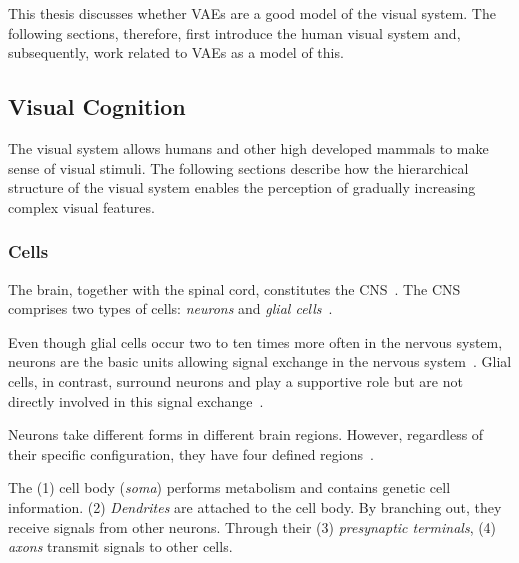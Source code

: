 This thesis discusses whether \acp{VAE} are a good model of the visual system.
The following sections, therefore, first introduce the human visual system and, subsequently, work related to \acp{VAE} as a model of this.

\subsection{Visual Cognition}\label{subsec:human-brain-structure}

The visual system allows humans and other high developed mammals to make sense of visual stimuli.
The following sections describe how the hierarchical structure of the visual system enables the perception of gradually increasing complex visual features.

\subsubsection{Cells}

The brain, together with the spinal cord, constitutes the \ac{CNS}~\citep[p. 340]{mack2013principles}.
The \ac{CNS} comprises two types of cells: \textit{neurons} and \textit{glial cells}~\citep[p. 71]{mack2013principles}.

Even though glial cells occur two to ten times more often in the nervous system, neurons are the basic units allowing signal exchange in the nervous system~\citep[p. 24]{mack2013principles}.
Glial cells, in contrast, surround neurons and play a supportive role but are not directly involved in this signal exchange~\citep[p. 26]{mack2013principles}.

Neurons take different forms in different brain regions.
However, regardless of their specific configuration, they have four defined regions~\citep[p. 22]{mack2013principles}.

The (1) cell body (\textit{soma}) performs metabolism and contains genetic cell information.
(2) \textit{Dendrites} are attached to the cell body.
By branching out, they receive signals from other neurons.
Through their (3) \textit{presynaptic terminals}, (4) \textit{axons} transmit signals to other cells.

